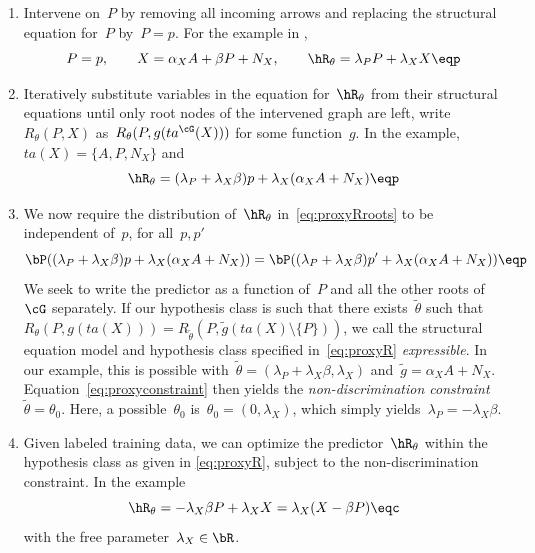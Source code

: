 \begin{enumerate}
  \item Intervene on~$P$ by removing all incoming arrows and replacing the
    structural equation for~$P$ by~$P=p$. For the example in
    ,
    \begin{equation} \label{eq:proxyR}
      P = p, \qquad
      X = \alpha_X A + \beta P + N_X, \qquad
      \hR_{\theta} = \lambda_P P + \lambda_X X \eqp
    \end{equation}
  \item Iteratively substitute variables in the equation for~$\hR_{\theta}$ from
    their structural equations until only root nodes of the intervened graph are
    left, \ie{} write~$R_{\theta}(P, X)$ as~$R_{\theta}(P, g(ta^{\cG}(X)))$ for
    some function~$g$. In the example,~$ta(X) = \{A, P, N_X\}$ and
    \begin{equation}\label{eq:proxyRroots}
      \hR_{\theta} = (\lambda_P + \lambda_X \beta) p + \lambda_X (\alpha_X A + N_X) \eqp
    \end{equation}
  \item We now require the distribution of~$\hR_{\theta}$
    in~\eqref{eq:proxyRroots} to be independent of~$p$, \ie{} for all~$p, p'$
    \begin{equation}\label{eq:proxyconstraint}
      \bP((\lambda_P + \lambda_X \beta) p  + \lambda_X (\alpha_X A + N_X)) =
      \bP((\lambda_P + \lambda_X \beta) p' + \lambda_X (\alpha_X A + N_X)) \eqp
    \end{equation}
    We seek to write the predictor as a function of~$P$ and all the other roots
    of~$\cG$ separately. If our hypothesis class is such that there
    exists~$\tilde{\theta}$ such that~$R_{\theta}(P, g(ta(X))) =
    R_{\tilde{\theta}}(P, \tilde{g}(ta(X) \setminus \{P\}))$, we call the
    structural equation model and hypothesis class specified
    in~\eqref{eq:proxyR} \emph{expressible}. In our example, this is possible
    with~$\tilde{\theta} = (\lambda_P + \lambda_X \beta, \lambda_X)$
    and~$\tilde{g} = \alpha_X A + N_X$. Equation~\eqref{eq:proxyconstraint} then
    yields the \emph{non-discrimination constraint}~$\tilde{\theta} = \theta_0$.
    Here, a possible~$\theta_0$ is~$\theta_0 = (0, \lambda_X)$, which simply
    yields~$\lambda_P = -\lambda_X \beta$.
  \item Given labeled training data, we can optimize the
    predictor~$\hR_{\theta}$ within the hypothesis class as given in
    \eqref{eq:proxyR}, subject to the non-discrimination constraint. In the
    example
    \begin{equation*}
      \hR_{\theta} = -\lambda_X \beta P + \lambda_X X = \lambda_X (X - \beta P) \eqc
    \end{equation*}
    with the free parameter~$\lambda_X \in \bR$.
\end{enumerate}

